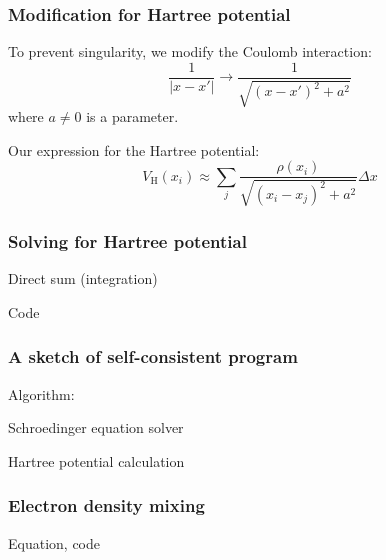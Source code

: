 \begin{frame}
\frametitle{Modification for Hartree potential}
    
To prevent singularity, we modify the Coulomb interaction:
\begin{equation*}
\frac{1}{\left| x - x' \right|} \rightarrow
\frac{1}{\sqrt{(x - x')^2 + a^2}}
\end{equation*}
where $a \neq 0$ is a parameter.

Our expression for the Hartree potential:
\begin{equation*}
V_{\mathrm{H}}(x_{i}) \approx \sum_{j} \frac{\rho(x_{i})}{\sqrt{ (x_{i} - x_{j})^2 + a^2 } } \Delta x
\end{equation*}

\end{frame}


\begin{frame}[fragile]
\frametitle{Solving for Hartree potential}

Direct sum (integration)

Code

\end{frame}


\begin{frame}
\frametitle{A sketch of self-consistent program}

Algorithm:

Schroedinger equation solver

Hartree potential calculation

\end{frame}


\begin{frame}
\frametitle{Electron density mixing}

Equation, code

\end{frame}




